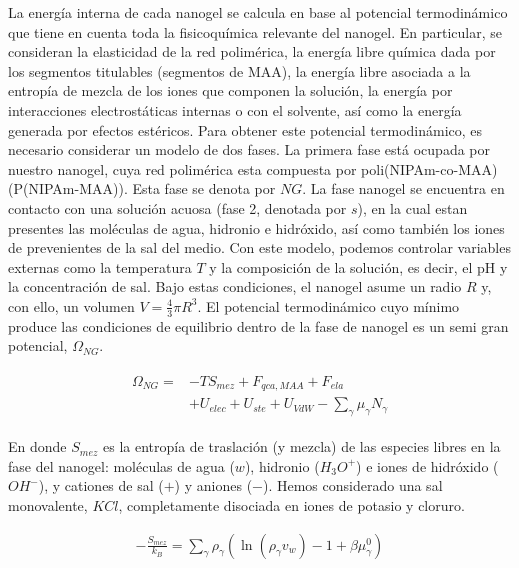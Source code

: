 	La energ\'ia interna de cada nanogel se calcula en base al potencial termodin\'amico que tiene en cuenta toda la fisicoqu\'imica relevante del nanogel. En particular, se consideran la elasticidad de la red polim\'erica, la energ\'ia libre qu\'imica dada por los segmentos titulables (segmentos de MAA), la energ\'ia libre asociada a la entrop\'ia de mezcla de los iones que componen la soluci\'on, la energ\'ia por interacciones electrost\'aticas internas o con el solvente, as\'i como la energ\'ia generada por efectos est\'ericos.
	Para obtener este potencial termodin\'amico, es necesario considerar un modelo de dos fases. La primera fase est\'a ocupada por nuestro nanogel, cuya red polim\'erica esta compuesta por poli(NIPAm-co-MAA) (P(NIPAm-MAA)). Esta fase se denota por $NG$. La fase nanogel se encuentra en contacto con una soluci\'on acuosa (fase 2, denotada por $s$), en la cual estan presentes las mol\'eculas de agua, hidronio e hidr\'oxido, as\'i como tambi\'en los iones de prevenientes de la sal del medio.
	Con este modelo, podemos controlar variables externas como la temperatura $T$ y la composici\'on de la soluci\'on, es decir, el pH y la concentraci\'on de sal. Bajo estas condiciones, el nanogel asume un radio $R$ y, con ello, un volumen $V=\frac{4}{3}\pi R^3$.
	El potencial termodin\'amico cuyo m\'inimo produce las condiciones de equilibrio dentro de la fase de nanogel es un semi gran potencial, $\Omega_{NG}$.
	
	
	
	\begin{align}
		\begin{aligned}
			\Omega_{NG}=& -TS_{mez} + F_{qca,MAA} +  F_{ela}\\
			& + U_{elec}+  U_{ste} + U_{VdW} -{\sum_{\gamma}
				{\mu_\gamma N_\gamma}}
		\end{aligned}
		\label{eq:mc:free-energy-implicit}
	\end{align}
	
	
	\noindent En donde $S_{mez}$ es la entrop\'ia de traslaci\'on (y mezcla) de las especies libres en la fase del nanogel: mol\'eculas de agua ($w$), hidronio ($H_3O^+$) e iones de hidr\'oxido ($OH^-$), y cationes de sal ($+$) y aniones ($-$).
	Hemos considerado una sal monovalente, $KCl$,  completamente disociada en iones de potasio y cloruro.
	
	\begin{align}
		-\frac{S_{mez}}{k_B}	= \sum_{\gamma} \rho_\gamma\left(\ln\left(\rho_\gamma v_w\right) -1 + \beta\mu^0_\gamma\right) 
	\end{align}
	
